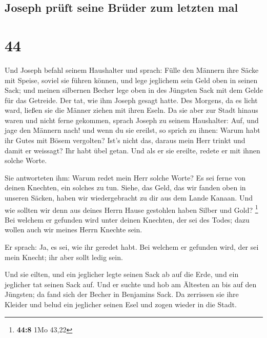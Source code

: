 \hypertarget{joseph-pruxfcft-seine-bruxfcder-zum-letzten-mal}{%
\subsection{Joseph prüft seine Brüder zum letzten
mal}\label{joseph-pruxfcft-seine-bruxfcder-zum-letzten-mal}}

\hypertarget{section-43}{%
\section{44}\label{section-43}}

 Und Joseph befahl seinem Haushalter und sprach: Fülle den
Männern ihre Säcke mit Speise, soviel sie führen können, und lege
jeglichem sein Geld oben in seinen Sack;  und meinen
silbernen Becher lege oben in des Jüngsten Sack mit dem Gelde für das
Getreide. Der tat, wie ihm Joseph gesagt hatte.  Des
Morgens, da es licht ward, ließen sie die Männer ziehen mit ihren Eseln.
 Da sie aber zur Stadt hinaus waren und nicht ferne
gekommen, sprach Joseph zu seinem Haushalter: Auf, und jage den Männern
nach! und wenn du sie ereilst, so sprich zu ihnen: Warum habt ihr Gutes
mit Bösem vergolten?  Ist's nicht das, daraus mein Herr
trinkt und damit er weissagt? Ihr habt übel getan.  Und
als er sie ereilte, redete er mit ihnen solche Worte.

 Sie antworteten ihm: Warum redet mein Herr solche Worte?
Es sei ferne von deinen Knechten, ein solches zu tun. 
Siehe, das Geld, das wir fanden oben in unseren Säcken, haben wir
wiedergebracht zu dir aus dem Lande Kanaan. Und wie sollten wir denn aus
deines Herrn Hause gestohlen haben Silber und Gold? \footnote{\textbf{44:8}
  1Mo 43,22}  Bei welchem er gefunden wird unter deinen
Knechten, der sei des Todes; dazu wollen auch wir meines Herrn Knechte
sein.

 Er sprach: Ja, es sei, wie ihr geredet habt. Bei welchem
er gefunden wird, der sei mein Knecht; ihr aber sollt ledig sein.

 Und sie eilten, und ein jeglicher legte seinen Sack ab
auf die Erde, und ein jeglicher tat seinen Sack auf.  Und
er suchte und hob am Ältesten an bis auf den Jüngsten; da fand sich der
Becher in Benjamins Sack.  Da zerrissen sie ihre Kleider
und belud ein jeglicher seinen Esel und zogen wieder in die Stadt.

